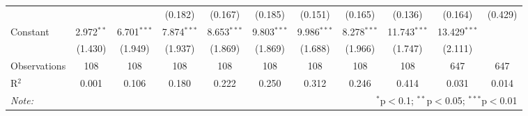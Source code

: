 \begin{tabular}{@{\hspace{5pt}}l@{\hspace{5pt}}cccccccccc}
  &  &  & (0.182) & (0.167) & (0.185) & (0.151) & (0.165) & (0.136) & (0.164) & (0.429) \\ 
 \addlinespace 
 Constant & 2.972$^{**}$ & 6.701$^{***}$ & 7.874$^{***}$ & 8.653$^{***}$ & 9.803$^{***}$ & 9.986$^{***}$ & 8.278$^{***}$ & 11.743$^{***}$ & 13.429$^{***}$ &  \\ 
  & (1.430) & (1.949) & (1.937) & (1.869) & (1.869) & (1.688) & (1.966) & (1.747) & (2.111) &  \\ 
 \addlinespace 
\midrule  
Observations & 108 & 108 & 108 & 108 & 108 & 108 & 108 & 108 & 647 & 647 \\ 
R$^{2}$ & 0.001 & 0.106 & 0.180 & 0.222 & 0.250 & 0.312 & 0.246 & 0.414 & 0.031 & 0.014 \\ 
\bottomrule 
\textit{Note:}  & \multicolumn{10}{r}{$^{*}$p$<$0.1; $^{**}$p$<$0.05; $^{***}$p$<$0.01} \\ 
\end{tabular} 
